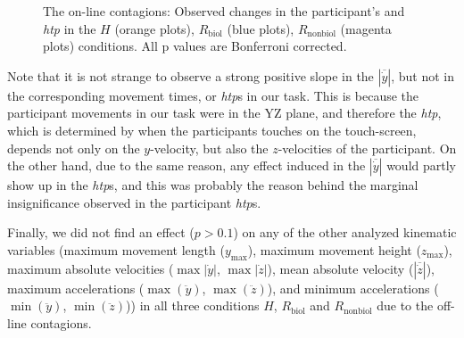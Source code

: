 \begin{figure}[t]
	\caption{The on-line contagions: Observed changes in the participant's  and \textit{htp} in the $\textit{H}$ (orange plots), $\textit{R}_{\text{biol}}$ (blue plots), $\textit{R}_{\text{nonbiol}}$ (magenta plots) conditions. All p values are Bonferroni corrected.}
	\label{fig:online}
\end{figure}

Note that it is not strange to observe a strong positive slope in the $|\overline{\dot{y}}|$, but not in the corresponding movement times, or {\it htp}s in our task. This is because the participant movements in our task were in the YZ plane, and therefore the {\it htp}, which is determined by when the participants touches on the touch-screen, depends not only on the $y$-velocity, but also the $z$-velocities of the participant. On the other hand, due to the same reason, any effect induced in the $|\overline{\dot{y}}|$ would partly show up in the {\it htp}s, and this was probably the reason behind the marginal insignificance observed in the participant {\it htp}s.

Finally, we did not find an effect ($p > 0.1$) on any of the other analyzed kinematic variables (maximum movement length ($y_{\max}$), maximum movement height ($z_{\max}$), maximum absolute velocities ($\max|\dot{y}|$, $\max|\dot{z}|$), mean absolute velocity ($|\overline{\dot{z}}|$), maximum accelerations ($\max(\ddot{y})$, $\max(\ddot{z})$), and minimum accelerations ($\min(\ddot{y})$, $\min(\ddot{z})$)) in all three conditions $H$, $R_{\text{biol}}$ and $R_{\text{nonbiol}}$ due to the off-line contagions.


